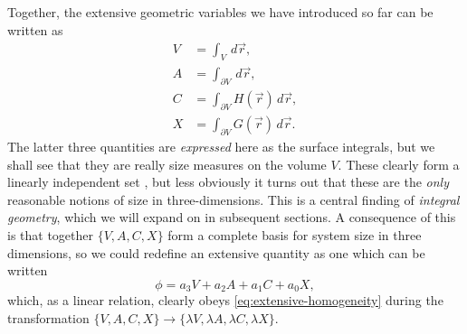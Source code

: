 Together, the extensive geometric variables we have introduced so far can be written as%
\begin{subequations}\label{eq:intrinsic-volumes-surface-integrals}
  \begin{align}
    \label{eq:volume-measure}
    V
    &=
    \int_V \, d\vec{r},
    \\
    A
    &=
    \int_{\partial V} \, d\vec{r},
    \\
    C
    &=
    \int_{\partial V} H(\vec{r}) \, d\vec{r},
    \\
    X
    &=
    \int_{\partial V} G(\vec{r}) \, d\vec{r}.
  \end{align}
\end{subequations}
The latter three quantities are \emph{expressed} here as the surface integrals, but we shall see that they are really size measures on the volume $V$.
These clearly form a linearly independent set%
,
but less obviously it turns out that these are the \emph{only} reasonable notions of size in three-dimensions.
This is a central finding of \emph{integral geometry}, which we will expand on in subsequent sections.
A consequence of this is that together $\{V, A, C, X\}$ form a complete basis for system size in three dimensions, so we could redefine an extensive quantity as one which can be written
\begin{equation}\label{eq:extensive-integral-geometry}
  \phi = a_3 V + a_2 A + a_1 C + a_0 X,
\end{equation}
which, as a linear relation, clearly obeys \eqref{eq:extensive-homogeneity} during the transformation%
$\{V, A, C, X\} \to \{\lambda V, \lambda A, \lambda C, \lambda X\}$.

